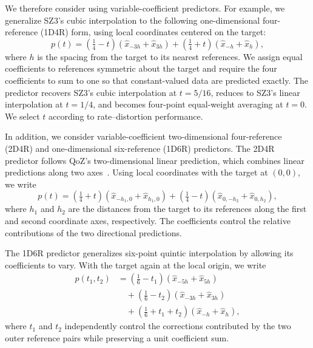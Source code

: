 We therefore consider using variable-coefficient predictors. For example, we generalize SZ3's cubic interpolation to the following one-dimensional four-reference (1D4R) form, using local coordinates centered on the target:
\begin{equation}
\label{eq:configuration-space:1d4r-prediction}
p(t)=(\tfrac14-t)(\hat x_{-3h}+\hat x_{3h})+(\tfrac14+t)(\hat x_{-h}+\hat x_h),
\end{equation}
where $h$ is the spacing from the target to its nearest references. We assign equal coefficients to references symmetric about the target and require the four coefficients to sum to one so that constant-valued data are predicted exactly. The predictor recovers SZ3's cubic interpolation at $t=5/16$, reduces to SZ3's linear interpolation at $t=1/4$, and becomes four-point equal-weight averaging at $t=0$. We select $t$ according to rate--distortion performance.

In addition, we consider variable-coefficient two-dimensional four-reference (2D4R) and one-dimensional six-reference (1D6R) predictors. The 2D4R predictor follows QoZ's two-dimensional linear prediction, which combines linear predictions along two axes~\cite{liu2024high}. Using local coordinates with the target at $(0,0)$, we write
\begin{equation}
\label{eq:configuration-space:2d4r-prediction}
p(t)=(\tfrac14+t)(\hat x_{-h_1,0}+\hat x_{h_1,0})+(\tfrac14-t)(\hat x_{0,-h_2}+\hat x_{0,h_2}),
\end{equation}
where $h_1$ and $h_2$ are the distances from the target to its references along the first and second coordinate axes, respectively. The coefficients control the relative contributions of the two directional predictions.

The 1D6R predictor generalizes six-point quintic interpolation by allowing its coefficients to vary. With the target again at the local origin, we write
\begin{equation}
\label{eq:configuration-space:1d6r-prediction}
\begin{aligned}
p(t_1,t_2)&=(\tfrac16-t_1)(\hat x_{-5h}+\hat x_{5h})\\
&\quad+(\tfrac16-t_2)(\hat x_{-3h}+\hat x_{3h})\\
&\quad+(\tfrac16+t_1+t_2)(\hat x_{-h}+\hat x_h),
\end{aligned}
\end{equation}
where $t_1$ and $t_2$ independently control the corrections contributed by the two outer reference pairs while preserving a unit coefficient sum.

